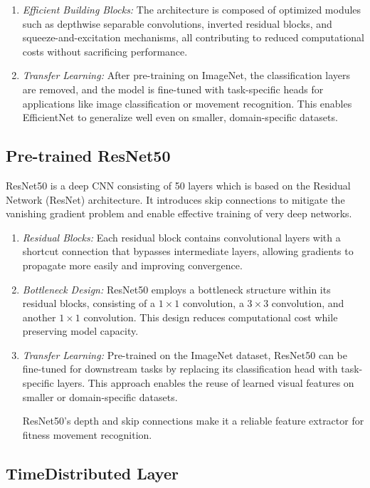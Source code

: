 \documentclass[conference]{IEEEtran}
\begin{document}
\begin{enumerate}
\item \textit{Efficient Building Blocks:} The architecture is composed of optimized modules such as depthwise separable convolutions, inverted residual blocks, and squeeze-and-excitation mechanisms, all contributing to reduced computational costs without sacrificing performance.

\item \textit{Transfer Learning:} After pre-training on ImageNet, the classification layers are removed, and the model is fine-tuned with task-specific heads for applications like image classification or movement recognition. This enables EfficientNet to generalize well even on smaller, domain-specific datasets.
\end{enumerate}
\subsection{Pre-trained ResNet50}
ResNet50 is a deep CNN consisting of 50 layers which is based on the Residual Network (ResNet) architecture. It introduces skip connections to mitigate the vanishing gradient problem and enable effective training of very deep networks.

\begin{enumerate}
\item \textit{Residual Blocks:} Each residual block contains convolutional layers with a shortcut connection that bypasses intermediate layers, allowing gradients to propagate more easily and improving convergence.

\item \textit{Bottleneck Design:} ResNet50 employs a bottleneck structure within its residual blocks, consisting of a \(1 \times 1\) convolution, a \(3 \times 3\) convolution, and another \(1 \times 1\) convolution. This design reduces computational cost while preserving model capacity.

\item \textit{Transfer Learning:} Pre-trained on the ImageNet dataset, ResNet50 can be fine-tuned for downstream tasks by replacing its classification head with task-specific layers. This approach enables the reuse of learned visual features on smaller or domain-specific datasets.

ResNet50’s depth and skip connections make it a reliable feature extractor for fitness movement recognition.
\end{enumerate}
\subsection{TimeDistributed Layer}
\end{document}
